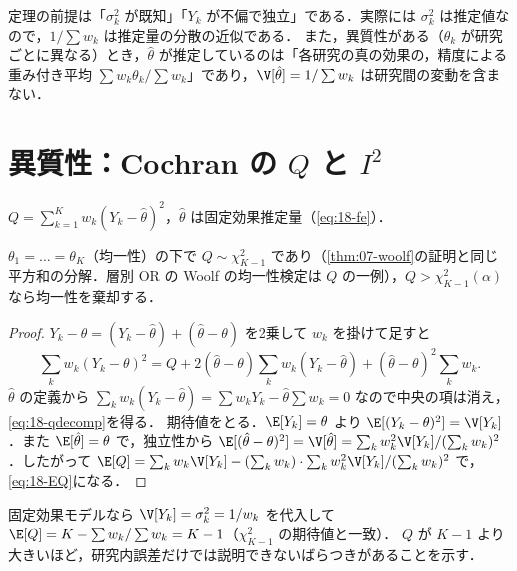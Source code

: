 \Youchui 定理の前提は「$\sigma_k^2$ が既知」「$Y_k$ が不偏で独立」である．実際には $\sigma_k^2$ は推定値なので，$1/\sum w_k$ は推定量の分散の近似である．
また，異質性がある（$\theta_k$ が研究ごとに異なる）とき，$\hat\theta$ が推定しているのは「各研究の真の効果の，精度による重み付き平均 $\sum w_k\theta_k/\sum w_k$」であり，$\V[\hat\theta]=1/\sum w_k$ は研究間の変動を含まない．

\section{異質性：Cochran の \texorpdfstring{$Q$}{Q} と \texorpdfstring{$I^2$}{I²}}\label{sec:18-q}
\Hissu
\begin{teigi}[Cochran の $Q$]\label{def:18-q}
$Q=\sum_{k=1}^Kw_k(Y_k-\hat\theta)^2$，$\hat\theta$ は固定効果推定量（\cref{eq:18-fe}）．
\end{teigi}
$\theta_1=\dots=\theta_K$（均一性）の下で $Q\sim\chi^2_{K-1}$ であり（\cref{thm:07-woolf}の証明と同じ平方和の分解．層別 OR の Woolf の均一性検定は $Q$ の一例），$Q>\chi^2_{K-1}(\alpha)$ なら均一性を棄却する．
\begin{proof}
$Y_k-\theta=(Y_k-\hat\theta)+(\hat\theta-\theta)$ を2乗して $w_k$ を掛けて足すと
\[
\sum_kw_k(Y_k-\theta)^2=Q+2(\hat\theta-\theta)\sum_kw_k(Y_k-\hat\theta)+(\hat\theta-\theta)^2\sum_kw_k .
\]
$\hat\theta$ の定義から $\sum_kw_k(Y_k-\hat\theta)=\sum w_kY_k-\hat\theta\sum w_k=0$ なので中央の項は消え，\cref{eq:18-qdecomp}を得る．
期待値をとる．$\E[Y_k]=\theta$ より $\E[(Y_k-\theta)^2]=\V[Y_k]$．また $\E[\hat\theta]=\theta$ で，独立性から
$\E[(\hat\theta-\theta)^2]=\V[\hat\theta]=\sum_kw_k^2\V[Y_k]/(\sum_kw_k)^2$．したがって
$\E[Q]=\sum_kw_k\V[Y_k]-(\sum_kw_k)\cdot\sum_kw_k^2\V[Y_k]/(\sum_kw_k)^2$ で，\cref{eq:18-EQ}になる．
\end{proof}
固定効果モデルなら $\V[Y_k]=\sigma_k^2=1/w_k$ を代入して $\E[Q]=K-\sum w_k/\sum w_k=K-1$（$\chi^2_{K-1}$ の期待値と一致）．
$Q$ が $K-1$ より大きいほど，研究内誤差だけでは説明できないばらつきがあることを示す．

